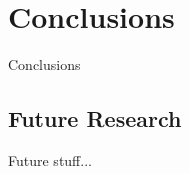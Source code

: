 \chapter{Conclusions}
\label{chap:conclusion}

Conclusions 


\section{Future Research}

Future stuff... 

